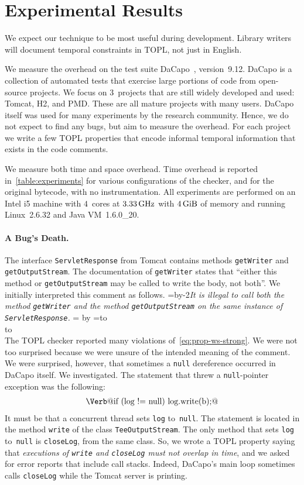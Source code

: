 \documentclass[9pt, preprint]{sigplanconf} %
\newcommand{\quoteindent}{1.5\parindent} %
\newcommand{\eqquote}[2]{{%
  \refstepcounter{equation}\label{#2}%
  \newdimen\qi\qi=\quoteindent
  \setbox0=\vbox{\advance\hsize by-2\qi\noindent\em#1}%
  \newdimen\x\x=\ht0 \advance\x by\dp0%
  \setbox1=\vbox to\x{\vss\hbox{(\arabic{equation})}\vss}%
  \leavevmode\\[1ex]%
  \hbox to\hsize{\hskip\qi\box0\hfil\box1}%
  \\[1ex]}}
\theoremstyle{definition}
\theoremstyle{remark}
\begin{document}
\section{Experimental Results}\label{sec:results} %

We expect our technique to be most useful during development.
Library writers will document temporal constraints in TOPL, not just in English.

We measure the overhead on the test suite DaCapo~\cite{dblp:conf/oopsla/dacapo}, version~9.12.
DaCapo is a collection of automated tests that exercise large portions of code from open-source projects.
We focus on $3$~projects that are still widely developed and used: Tomcat, H2, and PMD\null.
These are all mature projects with many users.
DaCapo itself was used for many experiments by the research community.
Hence, we do not expect to find any bugs, but aim to measure the overhead.
For each project we write a few TOPL properties that encode informal temporal information that exists in the code comments.

We measure both time and space overhead.
Time overhead is reported in~\autoref{table:experiments} for various configurations of the checker, and  for the original bytecode, with no instrumentation.
%
All experiments are performed on an Intel i5 machine with $4$~cores at $3.33\rm\,GHz$ with  $4\rm\,GiB$ of memory and 
running Linux~2.6.32 and Java VM~1.6.0\_20.

\paragraph{A Bug's Death.} %

The interface \texttt{ServletResponse} from Tomcat contains methods \texttt{getWriter} and \texttt{getOutputStream}.
The documentation of \texttt{getWriter} states that ``either this method or \texttt{getOutputStream} may be called to write the body, not both''.
We initially interpreted this comment as follows.
\eqquote{It is illegal to call both the method {\tt getWriter} and the method {\tt getOutputStream} on the same instance of {\tt ServletResponse}.}{eq:prop-ws-strong}
The TOPL checker reported many violations of~\eqref{eq:prop-ws-strong}.
We were not too surprised because we were unsure of the intended meaning of the comment.
We were surprised, however, that sometimes a {\tt null} dereference occurred in DaCapo itself.
We investigated.
The statement that threw a {\tt null}-pointer exception was the following:
\begin{align}\label{eq:npe-src}
\text{\Verb@if (log != null) log.write(b);@}
\end{align}
It must be that a concurrent thread sets {\tt log} to~{\tt null}.
The statement is located in the method {\tt write} of the class {\tt TeeOutputStream}.
The only method that sets {\tt log} to~{\tt null} is {\tt closeLog}, from the same class.
So, we wrote a TOPL property saying that \textit{executions of {\tt write} and {\tt closeLog} must not overlap in time}, and we asked for error reports that include call stacks.
Indeed, DaCapo's main loop sometimes calls {\tt closeLog} while the Tomcat server is printing.
\end{document}
